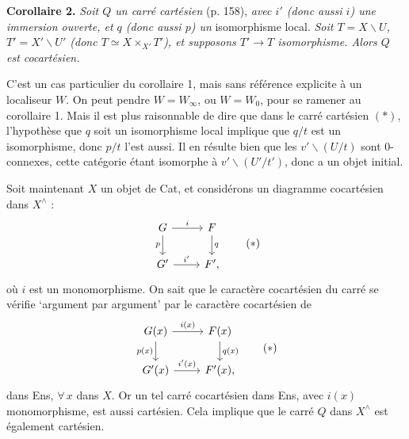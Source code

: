 \documentclass[11pt]{article}
\newcommand{\printedpage}[1]{\marginpar{\footnotesize p.~#1}}
\newcommand{\msp}[1]{\marginpar{\footnotesize [#1]}}
\begin{document}
\msp{page 161}
\textbf{Corollaire 2.} \textit{Soit $Q$ un carré cartésien} (p. 158), \textit{avec $i'$ (donc aussi $i$) une immersion ouverte, et $q$ (donc aussi $p$) un} isomorphisme local. \textit{Soit $T = X \backslash U$, $T' = X' \backslash U'$ (donc $T \simeq X \times_{X'} T'$), et supposons $T' \longrightarrow T$ isomorphisme. Alors $Q$ est cocartésien.}

C'est un cas particulier du corollaire 1, mais sans référence explicite à un localiseur $W$. On peut pendre $W = W_{\infty}$, ou $W = W_0$, pour se ramener au corollaire 1. Mais il est plus raisonnable de dire que dans le carré cartésien $(*)$, l'hypothèse que $q$ soit un isomorphisme local implique que $q/t$ est un isomorphisme, donc $p/t$ l'est aussi. Il en résulte bien que les $v' \backslash (U/t)$ sont 0-connexes, cette catégorie étant isomorphe à $v' \backslash (U'/t')$, donc a un objet initial. %

Soit maintenant $X$ un objet de Cat, et considérons un diagramme cocartésien dans $X^{\wedge}$ :
\[
\begin{tikzcd}
G \ar[r, "i"] \ar[d, "p"'] & F \ar[d, "q"] \\
G' \ar[r, "i'"] & F',
\end{tikzcd}
\tag*{$(*)$}
\]
\printedpage{111}
\msp{page 162}
où $i$ est un monomorphisme. On sait que le caractère cocartésien du carré se vérifie `argument par argument' par le caractère cocartésien de
\[
\begin{tikzcd}
G(x) \ar[r, "i(x)"] \ar[d, "p(x)"'] & F(x) \ar[d, "q(x)"] \\
G'(x) \ar[r, "i'(x)"] & F'(x),
\end{tikzcd}
\tag*{$(*)$}
\]
dans Ens, $\forall\, x$ dans $X$. Or un tel carré cocartésien dans Ens, avec $i(x)$ monomorphisme, est aussi cartésien. Cela implique que le carré $Q$ dans $X^{\wedge}$ est également cartésien.
\end{document}
